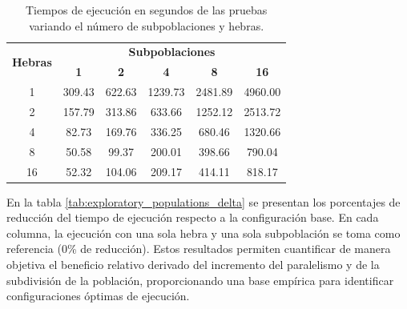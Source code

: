\begin{table}[ht]
    \centering
    \begin{tabular}{|c|ccccc|}
        \hline
        \multirow{2}{*}{\textbf{Hebras}} & \multicolumn{5}{c|}{\textbf{Subpoblaciones}}                                                      \\ \cline{2-6}
                                         & \textbf{1}                                   & \textbf{2} & \textbf{4} & \textbf{8} & \textbf{16} \\ \hline
        1                                & 309.43                                       & 622.63     & 1239.73    & 2481.89    & 4960.00     \\ \hline
        2                                & 157.79                                       & 313.86     & 633.66     & 1252.12    & 2513.72     \\ \hline
        4                                & 82.73                                        & 169.76     & 336.25     & 680.46     & 1320.66     \\ \hline
        8                                & 50.58                                        & 99.37      & 200.01     & 398.66     & 790.04      \\ \hline
        16                               & 52.32                                        & 104.06     & 209.17     & 414.11     & 818.17      \\ \hline
    \end{tabular}
    \caption{Tiempos de ejecución en segundos de las pruebas variando el número de subpoblaciones y hebras.}
    \label{tab:exploratory_subpopulations_times}
\end{table}

En la tabla \ref{tab:exploratory_populations_delta} se presentan los porcentajes de reducción del tiempo de ejecución respecto a la configuración base. En cada columna, la ejecución con una sola hebra y una sola subpoblación se toma como referencia (0\% de reducción). Estos resultados permiten cuantificar de manera objetiva el beneficio relativo derivado del incremento del paralelismo y de la subdivisión de la población, proporcionando una base empírica para identificar configuraciones óptimas de ejecución.

